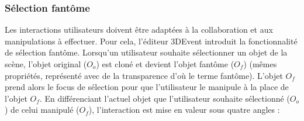 \subsubsection{Sélection fantôme}
Les interactions utilisateurs doivent être adaptées à la collaboration et aux 
manipulations à effectuer. Pour cela, l'éditeur 3DEvent introduit la fonctionnalité de 
sélection \og fantôme\fg{}. Lorsqu'un utilisateur souhaite sélectionner un objet de 
la scène, l'objet original ($O_o$) est 
cloné et devient l'objet fantôme ($O_f$) (mêmes propriétés, représenté avec de la 
transparence d'où le terme \og fantôme\fg{}). 
L'objet $O_f$ prend alors le focus de sélection pour que l'utilisateur le manipule à 
la place de l'objet $O_f$. 
En différenciant l'actuel objet que l'utilisateur souhaite sélectionné ($O_{o}$) de 
celui manipulé ($O_f$), l'interaction est mise en valeur sous quatre angles :
